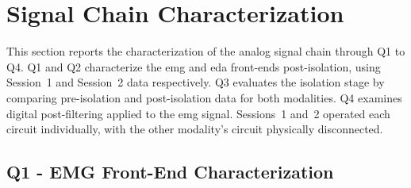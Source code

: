 %
%

\section{Signal Chain Characterization}
\label{sec:results-frontend}

This section reports the characterization of the analog signal chain through Q1 to Q4. Q1 and Q2 characterize the \gls{emg} and \gls{eda} front-ends post-isolation, using Session~1 and Session~2 data respectively. Q3 evaluates the isolation stage by comparing pre-isolation and post-isolation data for both modalities. Q4 examines digital post-filtering applied to the \gls{emg} signal. Sessions~1 and~2 operated each circuit individually, with the other modality's circuit physically disconnected.



%

\subsection{Q1 - EMG Front-End Characterization}
\label{sec:results-q1}

